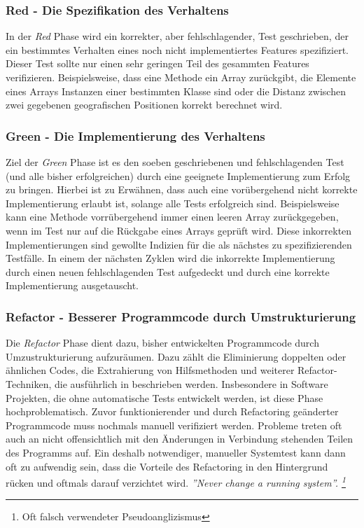 \subsubsection{Red - Die Spezifikation des Verhaltens}

In der \textit{Red} Phase wird ein korrekter, aber fehlschlagender,
Test geschrieben, der ein bestimmtes Verhalten eines noch nicht
implementiertes Features spezifiziert. Dieser Test sollte nur einen
sehr geringen Teil des gesammten Features
verifizieren. Beispielsweise, dass eine Methode ein Array zurückgibt,
die Elemente eines Arrays Instanzen einer bestimmten Klasse sind oder
die Distanz zwischen zwei gegebenen geografischen Positionen korrekt
berechnet wird.

\subsubsection{Green - Die Implementierung des Verhaltens}

Ziel der \textit{Green} Phase ist es den soeben geschriebenen und
fehlschlagenden Test (und alle bisher erfolgreichen) durch eine
geeignete Implementierung zum Erfolg zu bringen. Hierbei ist zu
Erwähnen, dass auch eine vorübergehend nicht korrekte Implementierung
erlaubt ist, solange alle Tests erfolgreich sind. Beispielsweise kann
eine Methode vorrübergehend immer einen leeren Array zurückgegeben,
wenn im Test nur auf die Rückgabe eines Arrays geprüft wird. Diese
inkorrekten Implementierungen sind gewollte Indizien für die als
nächstes zu spezifizierenden Testfälle. In einem der nächsten Zyklen
wird die inkorrekte Implementierung durch einen neuen fehlschlagenden
Test aufgedeckt und durch eine korrekte Implementierung ausgetauscht.

\subsubsection{Refactor - Besserer Programmcode durch
  Umstrukturierung}

Die \textit{Refactor} Phase dient dazu, bisher entwickelten
Programmcode durch Umzustrukturierung aufzuräumen. Dazu zählt die
Eliminierung doppelten oder ähnlichen Codes, die Extrahierung von
Hilfsmethoden und weiterer Refactor-Techniken, die ausführlich in
\cite{fowler99refactoring} beschrieben werden. Insbesondere in
Software Projekten, die ohne automatische Tests entwickelt werden, ist
diese Phase hochproblematisch. Zuvor funktionierender und durch
Refactoring geänderter Programmcode muss nochmals manuell verifiziert
werden. Probleme treten oft auch an nicht offensichtlich mit den
Änderungen in Verbindung stehenden Teilen des Programms auf. Ein
deshalb notwendiger, manueller Systemtest kann dann oft zu aufwendig
sein, dass die Vorteile des Refactoring in den Hintergrund rücken und
oftmals darauf verzichtet wird.  \textit{''Never change a running
  system''. \footnote{Oft falsch verwendeter Pseudoanglizismus}}

